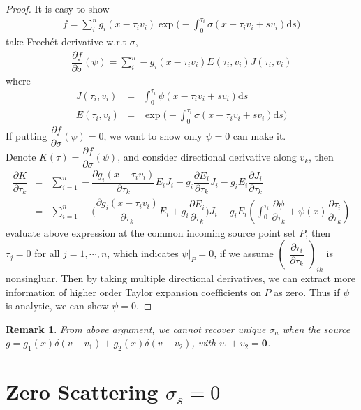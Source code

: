 \documentclass[12pt,a4paper]{article}
\newtheorem{Rek}{Remark}
\begin{document}
\begin{proof}
It is easy to show 
\begin{eqnarray}
f = \sum_i^n g_i(x - \tau_i v_i) \exp\Big(-\int_0^{\tau_i} \sigma(x-\tau_i v_i + sv_i)\mathrm{d}s\Big)
\end{eqnarray}
take Frech\'{e}t derivative w.r.t $\sigma$,
\begin{eqnarray}
\dfrac{\partial f}{\partial \sigma}(\psi) =\sum_i^n -g_i(x - \tau_i v_i)E(\tau_i,v_i)J(\tau_i,v_i)
\end{eqnarray}
where
\begin{eqnarray}
J(\tau_i,v_i) &=& \int_0^{\tau_i} \psi(x-\tau_i v_i + sv_i)\mathrm{d}s \\ 
E(\tau_i,v_i) &=&  \exp\Big(-\int_0^{\tau_i} \sigma(x-\tau_i v_i + sv_i)\mathrm{d}s\Big)
\end{eqnarray}
If putting $\dfrac{\partial f}{\partial \sigma}(\psi) = 0$, we want to show only $\psi =0$ can make it.
\\
Denote $K(\tau) = \dfrac{\partial f}{\partial \sigma}(\psi)$, and consider directional derivative along $v_k$, then
\begin{eqnarray}
\dfrac{\partial K}{\partial \tau_k} &=& \sum_{i=1}^n -\dfrac{\partial g_i(x-\tau_i v_i)}{\partial \tau_k}E_i J_i -g_i\dfrac{\partial E_i}{\partial \tau_k} J_i - g_iE_i\dfrac{\partial J_i}{\partial\tau_k}\\
&=& \sum_{i=1}^n -\Big(\dfrac{\partial g_i(x-\tau_i v_i)}{\partial \tau_k}E_i + g_i\dfrac{\partial E_i}{\partial \tau_k}  \Big) J_i - g_iE_i\left(\int_0^{\tau_i}\dfrac{\partial \psi}{\partial \tau_k} + \psi(x)\dfrac{\partial \tau_i}{\partial \tau_k}\right)\nonumber
\end{eqnarray}
evaluate above expression at the common incoming source point set $P$, then $\tau_j = 0$ for all $j=1,\cdots,n$, which indicates $\psi|_P = 0$, if we assume 
$
{\begin{pmatrix}
\dfrac{\partial \tau_i}{\partial \tau_k}
\end{pmatrix}}_{ik}
$ is nonsingluar. Then by taking multiple directional derivatives, we can extract more information of higher order Taylor expansion coefficients on $P$ as zero. Thus if $\psi$ is analytic, we can show $\psi = 0$.
\end{proof}
\begin{Rek}
From above argument, we cannot recover unique $\sigma_a$ when the source $g = g_1(x)\delta(v-v_1) + g_2(x)\delta(v-v_2)$, with $v_1 + v_2 = \mathbf{0}$.
\end{Rek}
\section{Zero Scattering $\sigma_s = 0$}
\end{document}

